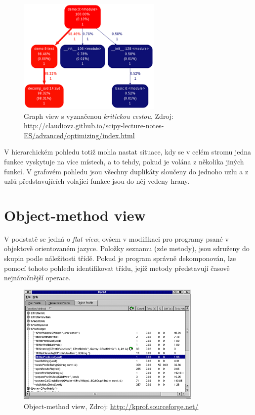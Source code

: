\documentclass[czech,BP]{thesiskiv}
\begin{document}
\begin{figure}[H]
    \centering
    \includegraphics[interpolate,width=0.62\textwidth]{img/prof_graph.png}
    \caption{Graph view s vyznačenou \emph{kritickou cestou}, Zdroj: \url{http://claudiovz.github.io/scipy-lecture-notes-ES/advanced/optimizing/index.html} }
    \label{obr:gview}
\end{figure}

V hierarchickém pohledu totiž mohla nastat situace, kdy se v celém stromu jedna funkce vyskytuje na více místech, a to tehdy, pokud je volána z několika jiných funkcí. V grafovém pohledu jsou všechny duplikáty sloučeny do jednoho uzlu a z uzlů představujících volající funkce jsou do něj vedeny hrany.

\section{Object-method view}

V podstatě se jedná o \emph{flat view}, ovšem v modifikaci pro programy psané v objektově orientovaném jazyce. Položky seznamu (zde metody), jsou sdruženy do skupin podle náležitosti třídě. Pokud je program správně dekomponován, lze pomocí tohoto pohledu identifikovat třídu, jejíž metody představují časově nejnáročnější operace.

\begin{figure}[H]
    \centering
    \includegraphics[interpolate,width=0.8\textwidth]{img/prof_objectview.png}
    \caption{Object-method view, Zdroj: \url{http://kprof.sourceforge.net/} }
    \label{obr:objview}
\end{figure}
\end{document}
